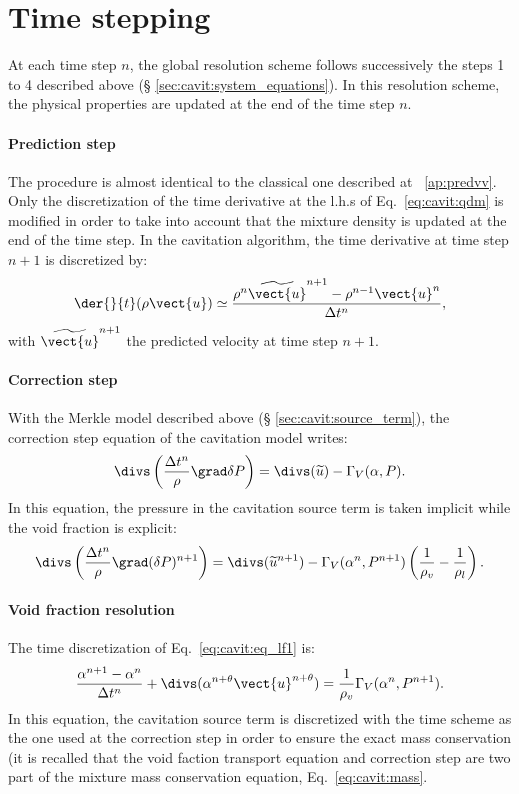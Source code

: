 \section{Time stepping}\label{sec:cavit:time_stepping}
At each time step $n$, the global resolution scheme follows successively
the steps 1 to 4 described above (\S
\ref{sec:cavit:system_equations}). In this resolution scheme, the physical
properties are updated at the end of the time step $n$.

\paragraph{Prediction step} The procedure is almost identical to the
classical one described at \appendixname~\ref{ap:predvv}. Only the
discretization of the time derivative at the l.h.s of
Eq.~\eqref{eq:cavit:qdm} is modified in order to take into account that the
mixture density is updated at the end of the time step. In the
cavitation algorithm, the time derivative at time step $n+1$ is
discretized by:
\begin{equation*}
\der{}{
t}(\rho\vect{u})\simeq \frac{\rho^n\widetilde{\vect{u}}^{n+1}-\rho^{n-1}\vect{u}^n}{\Delta t^n},
\end{equation*}
%
with $\widetilde{\vect{u}}^{n+1}$ the predicted velocity at time step
$n+1$.
%
\paragraph{Correction step}
With the Merkle model described above (\S
\ref{sec:cavit:source_term}), the correction step equation of the
cavitation model writes:
\begin{equation*}
\divs\left(\frac{\Delta t^n}{\rho}\grad\delta P\right) =
\divs(\widetilde{u})-\Gamma_V(\alpha,P).
\end{equation*}
In this equation, the pressure in the cavitation source term is taken
implicit while the void fraction is explicit:
\begin{equation*}
\divs\left(\frac{\Delta t^n}{\rho}\grad(\delta P)^{n+1}\right) =
\divs(\widetilde{u}^{n+1})-\Gamma_V(\alpha^n,P^{n+1})\left(\frac{1}{\rho_v}-\frac{1}{\rho_l}\right).
\end{equation*}
%
\paragraph{Void fraction resolution}
The time discretization of Eq.~\eqref{eq:cavit:eq_lf1} is:
\begin{equation}\label{eq:cavit:eq_vf_dis}
\frac{\alpha^{n+1}-\alpha^n}{\Delta t^n}+\divs(\alpha^{n+\theta}\vect{u}^{n+\theta}) =
\frac{1}{\rho_v}\Gamma_V(\alpha^n,P^{n+1}).
\end{equation}
In this equation, the cavitation source term is discretized with the
time scheme as the one used at the correction step in order to
ensure the exact mass conservation (it is recalled that the void
faction transport equation and correction step are two part of the
mixture mass conservation equation, Eq.~\eqref{eq:cavit:mass}.

%
